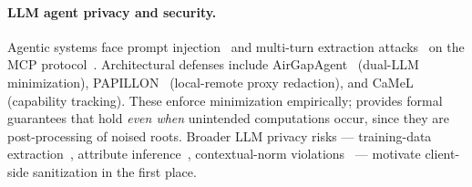 \paragraph{LLM agent privacy and security.}
Agentic systems face prompt injection~\cite{greshake2023indirect,zhan2024injecagent,debenedetti2024agentdojo,hou2025mcp} and multi-turn extraction attacks~\cite{zhang2025searchingprivacyrisks} on the MCP protocol~\cite{anthropic2024mcp}. Architectural defenses include AirGapAgent~\cite{bagdasarian2024airgapagent} (dual-LLM minimization), PAPILLON~\cite{siyan2025papillon} (local-remote proxy redaction), and CaMeL~\cite{debenedetti2025camel} (capability tracking). These enforce minimization empirically; \sysname{} provides formal guarantees that hold \emph{even when} unintended computations occur, since they are post-processing of noised roots. Broader LLM privacy risks --- training-data extraction~\cite{carlini2021extracting}, attribute inference~\cite{staab2024beyond}, contextual-norm violations~\cite{mireshghallah2024can,shao2024privacylens} --- motivate client-side sanitization in the first place.
